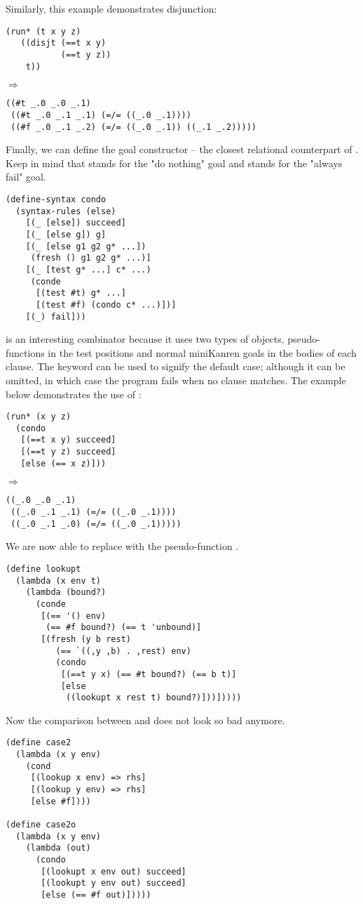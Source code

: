 Similarly, this example demonstrates disjunction:
\begin{lstlisting}
(run* (t x y z)
   ((disjt (==t x y)
           (==t y z))
    t))
\end{lstlisting}
$\Rightarrow$
\begin{lstlisting}
((#t _.0 _.0 _.1)
 ((#t _.0 _.1 _.1) (=/= ((_.0 _.1))))
 ((#f _.0 _.1 _.2) (=/= ((_.0 _.1)) ((_.1 _.2)))))
\end{lstlisting}

Finally, we can define the goal constructor  -- the closest relational counterpart of . Keep in mind that  stands for the "do nothing" goal and  stands for the "always fail" goal.
\begin{lstlisting}
(define-syntax condo
  (syntax-rules (else)
    [(_ [else]) succeed]
    [(_ [else g]) g]
    [(_ [else g1 g2 g* ...])
     (fresh () g1 g2 g* ...)]
    [(_ [test g* ...] c* ...)
     (conde
      [(test #t) g* ...]
      [(test #f) (condo c* ...)])]
    [(_) fail]))
\end{lstlisting}
 is an interesting combinator because it uses two types of objects, pseudo-functions in the test positions and normal miniKanren goals in the bodies of each clause. The  keyword can be used to signify the default case; although it can be omitted, in which case the program fails when no clause matches. The example below demonstrates the use of :
\begin{lstlisting}
(run* (x y z)
  (condo
   [(==t x y) succeed]
   [(==t y z) succeed]
   [else (== x z)]))
\end{lstlisting}
$\Rightarrow$
\begin{lstlisting}
((_.0 _.0 _.1)
 ((_.0 _.1 _.1) (=/= ((_.0 _.1))))
 ((_.0 _.1 _.0) (=/= ((_.0 _.1)))))
\end{lstlisting}

We are now able to replace  with the pseudo-function .
\begin{lstlisting}
(define lookupt
  (lambda (x env t)
    (lambda (bound?)
      (conde
       [(== '() env)
        (== #f bound?) (== t 'unbound)]
       [(fresh (y b rest)
          (== `((,y ,b) . ,rest) env)
          (condo
           [(==t y x) (== #t bound?) (== b t)]
           [else
            ((lookupt x rest t) bound?)]))]))))
\end{lstlisting}
Now the comparison between  and  does not look so bad anymore.
\begin{lstlisting}
(define case2
  (lambda (x y env)
    (cond
     [(lookup x env) => rhs]
     [(lookup y env) => rhs]
     [else #f])))

(define case2o
  (lambda (x y env)
    (lambda (out)
      (condo
       [(lookupt x env out) succeed]
       [(lookupt y env out) succeed]
       [else (== #f out)]))))
\end{lstlisting}

